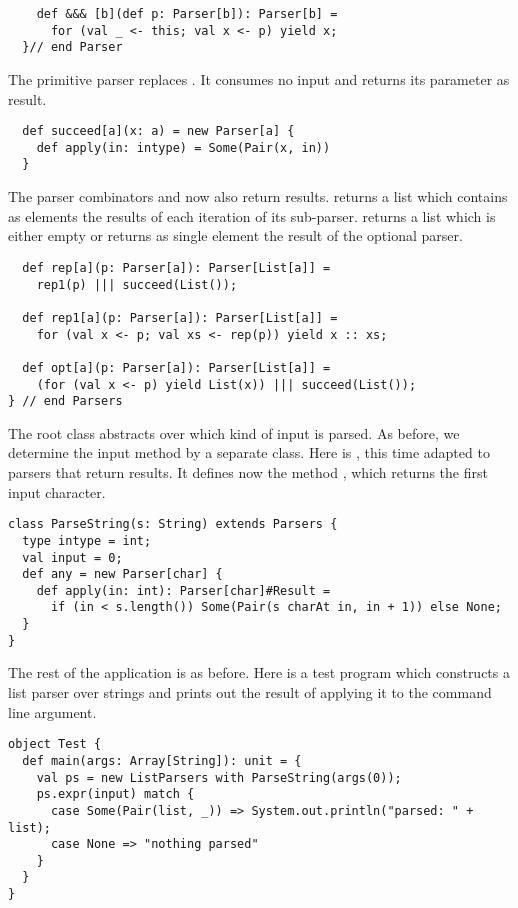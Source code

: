 \documentclass[a4paper,12pt,twoside,titlepage]{book}
\begin{document}
{\begin{lstlisting}
    def &&& [b](def p: Parser[b]): Parser[b] = 
      for (val _ <- this; val x <- p) yield x;
  }// end Parser
\end{lstlisting}

The primitive parser  replaces . It consumes
no input and returns its parameter as result.
\begin{lstlisting}
  def succeed[a](x: a) = new Parser[a] {
    def apply(in: intype) = Some(Pair(x, in))
  }
\end{lstlisting}

The parser combinators  and  now also return
results.  returns a list which contains as elements the
results of each iteration of its sub-parser.  returns a list
which is either empty or returns as single element the result of the
optional parser.
\begin{lstlisting}
  def rep[a](p: Parser[a]): Parser[List[a]] =
    rep1(p) ||| succeed(List());

  def rep1[a](p: Parser[a]): Parser[List[a]] =
    for (val x <- p; val xs <- rep(p)) yield x :: xs;

  def opt[a](p: Parser[a]): Parser[List[a]] =
    (for (val x <- p) yield List(x)) ||| succeed(List());
} // end Parsers
\end{lstlisting}
The root class  abstracts over which kind of
input is parsed.  As before, we determine the input method by a separate class.
Here is , this time adapted to parsers that return results.
It defines now the method , which returns the first input character.
\begin{lstlisting}
class ParseString(s: String) extends Parsers {
  type intype = int;
  val input = 0;
  def any = new Parser[char] {
    def apply(in: int): Parser[char]#Result =
      if (in < s.length()) Some(Pair(s charAt in, in + 1)) else None;
  }
}
\end{lstlisting}
The rest of the application is as before. Here is a test program which
constructs a list parser over strings and prints out the result of
applying it to the command line argument.
\begin{lstlisting}
object Test {
  def main(args: Array[String]): unit = {
    val ps = new ListParsers with ParseString(args(0));
    ps.expr(input) match {
      case Some(Pair(list, _)) => System.out.println("parsed: " + list);
      case None => "nothing parsed"
    }
  }
}
\end{lstlisting}

}
\end{document}

